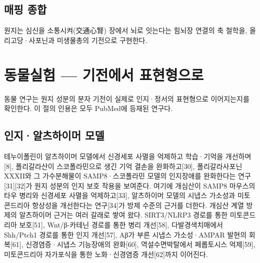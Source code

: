 \documentclass[12pt,oneside]{book}
\begin{document}
\subsection{매핑 종합}

\vspace{2pt}\vspace{3pt}

원지는 심신을 소통시켜(交通心腎) 장에서 뇌로 잇는다는 힘뇌장 연결의 축 철학을, 올리고당·사포닌과 미생물총의 기전으로 구현한다.

\section{동물실험 — 기전에서 표현형으로}

동물 연구는 원지 성분의 분자 기전이 실제로 인지·정서의 표현형으로 이어지는지를 확인한다. 이 절의 인용은 모두 PubMed에 등재된 연구다.

\subsection{인지·알츠하이머 모델}

테누이폴린이 알츠하이머 모델에서 신경세포 사멸을 억제하고 학습·기억을 개선하며[8], 폴리갈라산이 스코폴라민으로 생긴 기억 결손을 완화하고[30], 폴리갈라사포닌 XXXII와 그 가수분해물이 SAMP8·스코폴라민 모델의 인지장애를 완화한다는 연구[31][32]가 원지 성분의 인지 보호 작용을 보여준다. 여기에 개심산이 SAMP8 마우스의 타우 병리와 신경세포 사멸을 억제하고[33], 알츠하이머 모델의 시냅스 가소성과 미토콘드리아 항상성을 개선한다는 연구[34]가 방제 수준의 근거를 더한다. 개심산 계열 방제의 알츠하이머 근거는 여러 갈래로 쌓여 왔다. SIRT3/NLRP3 경로를 통한 미토콘드리아 보호[51], Wnt/β-카테닌 경로를 통한 병리 개선[58], 다발경색치매에서 Shh/Ptch1 경로를 통한 인지 개선[57], Aβ가 부른 시냅스 가소성·AMPAR 발현의 회복[61], 신경염증·시냅스 기능장애의 완화[60], 역설수면박탈에서 페롭토시스 억제[59], 미토콘드리아 자가포식을 통한 노화·신경염증 개선[62]까지 이어진다.
\end{document}
